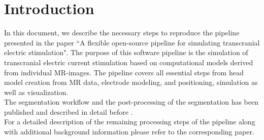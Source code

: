 \section{Introduction}
In this document, we describe the necessary steps to reproduce the pipeline presented
in the paper ``A flexible open-source pipeline for simulating transcranial electric stimulation".
The purpose of this software pipeline is the simulation of transcranial electric current stimulation
based on computational models derived from individual MR-images. The pipeline covers all essential
steps from head model creation from MR data, electrode modeling, and positioning, simulation
as well as visualization.\\
The segmentation workflow and the post-processing of the segmentation has been published and
described in detail before \cite{kalloch2018semi}.\\
For a detailed description of the remaining processing steps of the pipeline along with additional
background information please refer to the corresponding paper. 
